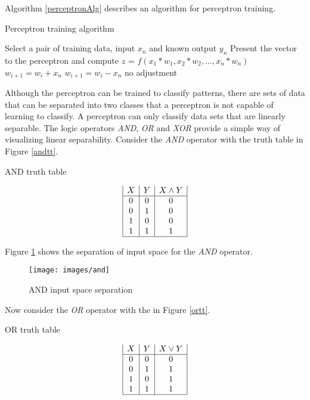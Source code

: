 Algorithm \ref{perceptronAlg} describes an algorithm for perceptron training.

\begin{algorithm}[h!]
\caption{Perceptron training algorithm}
\label{perceptronAlg}    
\begin{algorithmic}

\STATE Select a pair of training data, input $x_n$ and known output $y_n$
\STATE Present the vector to the perceptron and compute $z$ = $f(x_1 * w_1, x_2 * w_2, ..., x_n * w_n)$
\STATE $w_{i+1} = w_i + x_n$
\STATE $w_{i+1} = w_i - x_n$
 \ELSE
\STATE no adjustment
\ENDIF
\ENDWHILE
\end{algorithmic}
\end{algorithm}

Although the perceptron can be trained to classify patterns, there are sets of data that can be separated into two classes that a perceptron is not capable of learning to classify.
A perceptron can only classify data sets that are linearly separable.
The logic operators {\it AND}, {\it OR} and {\it XOR} provide a simple way of visualizing linear separability.
Consider the {\it AND} operator with the truth table in Figure \ref{andtt}.
\begin{table}[h!]
  \caption{AND truth table}
  \label{andtt}
\begin{displaymath}
\begin{array}{|c|c|c|}
   X
 & Y
 & X \land Y
\\
\hline
0 & 0 & 0\\
0 & 1 & 0\\
1 & 0 & 0\\
1 & 1 & 1\\
\hline
\end{array}
\end{displaymath}
\end{table}

Figure \ref{ands} shows the separation of input space for the {\it AND} operator.

\begin{figure}[h!]
  \centering
  \texttt{[image: images/and]}
  \caption{AND input space separation}
  \label{ands}
\end{figure}

Now consider the {\it OR} operator with the in Figure \ref{ortt}. 

\begin{table}[h!]
\caption{OR truth table}
\label{ortt}
\begin{displaymath}
\begin{array}{|c|c|c|}
   X
 & Y
 & X \lor Y
\\
\hline
0 & 0 & 0\\
0 & 1 & 1\\
1 & 0 & 1\\
1 & 1 & 1\\
\hline
\end{array}
\end{displaymath}
\end{table}

